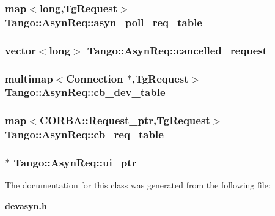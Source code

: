 \subsubsection[{asyn\-\_\-poll\-\_\-req\-\_\-table}]{\setlength{\rightskip}{0pt plus 5cm}map$<$long,{\bf Tg\-Request}$>$ Tango\-::\-Asyn\-Req\-::asyn\-\_\-poll\-\_\-req\-\_\-table\hspace{0.3cm}{\ttfamily [protected]}}\label{classTango_1_1AsynReq_abf576e773e62e7f20b3972b2478458fa}
\subsubsection[{cancelled\-\_\-request}]{\setlength{\rightskip}{0pt plus 5cm}vector$<$long$>$ Tango\-::\-Asyn\-Req\-::cancelled\-\_\-request\hspace{0.3cm}{\ttfamily [protected]}}\label{classTango_1_1AsynReq_acde2d2aba10f49ff4fe5fad1ab508370}
\subsubsection[{cb\-\_\-dev\-\_\-table}]{\setlength{\rightskip}{0pt plus 5cm}multimap$<$Connection $\ast$,{\bf Tg\-Request}$>$ Tango\-::\-Asyn\-Req\-::cb\-\_\-dev\-\_\-table\hspace{0.3cm}{\ttfamily [protected]}}\label{classTango_1_1AsynReq_a12999a86b535765b5e0c1da4c29eefb2}
\subsubsection[{cb\-\_\-req\-\_\-table}]{\setlength{\rightskip}{0pt plus 5cm}map$<$C\-O\-R\-B\-A\-::\-Request\-\_\-ptr,{\bf Tg\-Request}$>$ Tango\-::\-Asyn\-Req\-::cb\-\_\-req\-\_\-table\hspace{0.3cm}{\ttfamily [protected]}}\label{classTango_1_1AsynReq_ae3bcdf7be7d8fb5e17b0e2a00a23206d}
\subsubsection[{ui\-\_\-ptr}]{$\ast$ Tango\-::\-Asyn\-Req\-::ui\-\_\-ptr\hspace{0.3cm}{\ttfamily [protected]}}\label{classTango_1_1AsynReq_af5c541f5c4b03e3a693a97716fb6f40e}


The documentation for this class was generated from the following file\-:\begin{DoxyCompactItemize}
\item 
{\bf devasyn.\-h}\end{DoxyCompactItemize}
